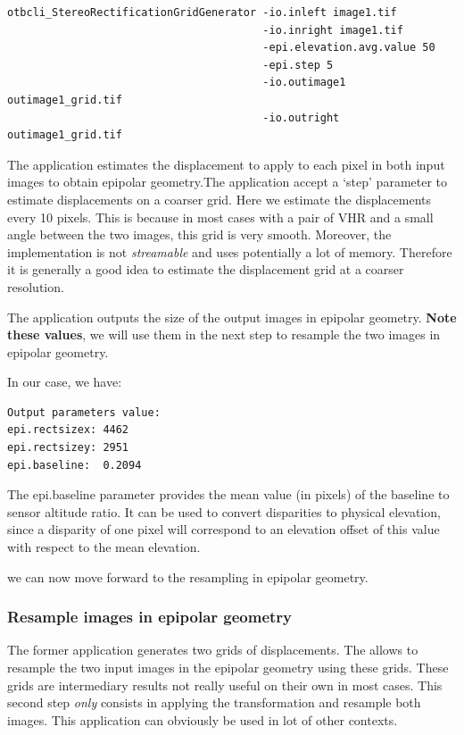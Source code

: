 \begin{verbatim}
otbcli_StereoRectificationGridGenerator -io.inleft image1.tif
                                        -io.inright image1.tif
                                        -epi.elevation.avg.value 50
                                        -epi.step 5
                                        -io.outimage1 outimage1_grid.tif
                                        -io.outright outimage1_grid.tif
\end{verbatim}

The application estimates the displacement to apply to each pixel in
both input images to obtain epipolar geometry.The application accept a
`step' parameter to estimate displacements on a coarser grid. Here we
estimate the displacements every 10 pixels. This is because in most
cases with a pair of VHR and a small angle between the two images,
this grid is very smooth. Moreover, the implementation is
not \textit{streamable} and uses potentially a lot of
memory. Therefore it is generally a good idea to estimate the
displacement grid at a coarser resolution.

The application outputs the size of the output images in epipolar
geometry. \textbf{Note these values}, we will use them in the next step to
resample the two images in epipolar geometry.

In our case, we have:

\begin{verbatim}
Output parameters value:
epi.rectsizex: 4462
epi.rectsizey: 2951
epi.baseline:  0.2094
\end{verbatim}

The epi.baseline parameter provides the mean value (in pixels) of the
baseline to sensor altitude ratio. It can be used to convert disparities to
physical elevation, since a disparity of one pixel will correspond to an
elevation offset of this value with respect to the mean elevation.

we can now move forward to the resampling in epipolar geometry.

\subsubsection{Resample images in epipolar geometry}

The former application generates two grids of
displacements. The  allows to
resample the two input images in the epipolar geometry using these
grids. These grids are intermediary results not really useful on their
own in most cases. This second step \textit{only} consists in applying
the transformation and resample both images. This application can
obviously be used in lot of other contexts.

